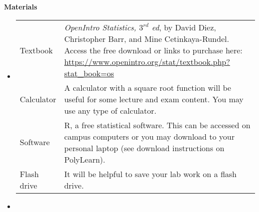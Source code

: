 \documentclass[letterpaper,12pt]{report}
\begin{document}
\textbf{Materials}
\begin{itemize}
\item[]
\begin{tabular}{p{2cm} p{14cm}}
Textbook & \emph{OpenIntro Statistics, $3^{rd}$ ed}, by David Diez, Christopher Barr, and Mine Cetinkaya-Rundel. Access the free download or links to purchase here: \url{https://www.openintro.org/stat/textbook.php?stat_book=os} \\
[1ex]
Calculator & A calculator with a square root function will be useful for some lecture and exam content. You may use any type of calculator.\\
[1ex]
Software &  R, a free statistical software.  This can be accessed on campus computers or you may download to your personal laptop (see download instructions on PolyLearn).\\
[1ex]
Flash drive & It will be helpful to save your lab work on a flash drive. \\
[1ex]
\end{tabular}
\item[]
\end{itemize}
\end{document}
